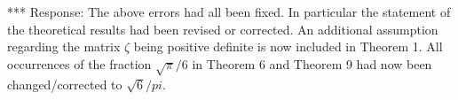 \documentclass{article}
\begin{document}
*** Response: The above errors had all been fixed. In particular the
statement of the theoretical results had been revised or corrected. An
additional assumption regarding the matrix $\zeta$ being positive
definite is now included in Theorem 1. All occurrences of the fraction
$\sqrt{\pi}/6$ in Theorem 6 and Theorem 9 had now been
changed/corrected to $\sqrt{6}/pi$.
\end{document}
